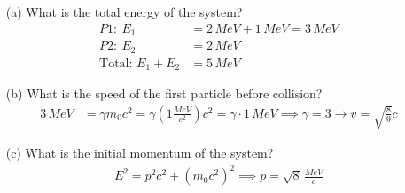 \documentclass[a4paper, 11pt, normalem]{report}
\begin{document}
\begin{itemize}
    \item[(a)] What is the total energy of the system?
        \begin{align}
            P1:~E_{1} &= 2\,MeV + 1\,MeV = 3\,MeV \\
            P2:~E_{2} &= 2\,MeV \\
            \text{Total: }E_{1} + E_{2} &= 5\,MeV
        \end{align}
    \item[(b)] What is the speed of the first particle before collision?
        \begin{align}
            3\,MeV &= \gamma m_{0}c^{2} = \gamma(1\frac{MeV}{c^{2}})c^{2} = \gamma\cdot1\,MeV \implies \gamma = 3 \rightarrow v = \sqrt{\frac{8}{9}}c
        \end{align}
    \item[(c)] What is the initial momentum of the system?
        \begin{align}
            E^{2} = p^{2}c^{2} + (m_{0}c^{2})^{2} \implies p = \sqrt{8}\,\frac{MeV}{c}
        \end{align}
\end{itemize}
\end{document}

